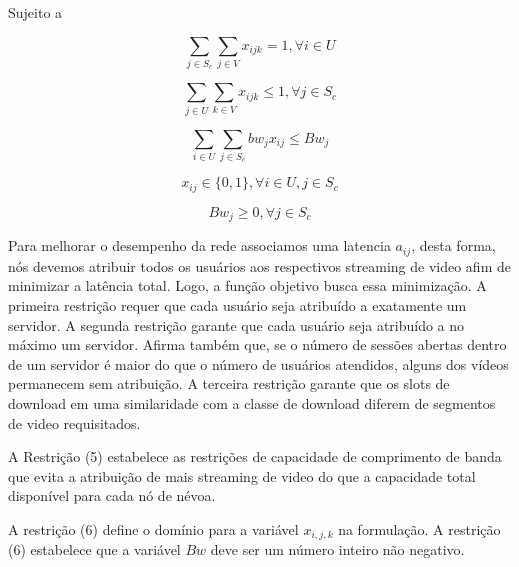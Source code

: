 Sujeito a

\begin{equation}\label{bound_1}
\sum_{ j \in S_{c} }
\sum_{ j \in V}
x_{ijk} = 1,  \forall i \in U
\end{equation}

\begin{equation}\label{bound_1}
\sum_{ j \in U}
\sum_{ k \in V }
x_{ijk} \leq 1,  \forall j \in S_{c}
\end{equation}

\begin{equation}\label{minimize}
\sum_{i \in U}
\sum_{j \in S_{c}}
bw_{j} x_{ij}
\leq Bw_{j}
\end{equation}

\begin{equation}\label{minimize}
x_{ij}  \in  \{0, 1\}, \forall i \in U,j \in S_{c}
\end{equation}

\begin{equation}\label{minimize}
Bw_{j} \geq  0, \forall j \in S_{c}
\end{equation}
\vspace{1.2cm}

Para melhorar o desempenho da rede associamos uma latencia $a_{ij}$, desta forma, nós devemos atribuir todos os usuários aos respectivos streaming de video afim de minimizar a latência total.
Logo, a função objetivo busca essa minimização. A primeira restrição requer que cada usuário seja atribuído a exatamente um servidor. A segunda restrição garante que cada usuário seja atribuído a no máximo um servidor. Afirma também que, se o número de sessões abertas dentro de um servidor é maior do que o número de usuários atendidos, alguns dos vídeos permanecem sem atribuição. A terceira restrição garante que os slots de download em uma similaridade com a classe de download diferem de segmentos de video requisitados.

A Restrição (5) estabelece as restrições de capacidade de comprimento de banda que evita a atribuição de mais streaming de video do que a capacidade total disponível para cada nó de névoa.

A restrição (6) define o domínio para a variável $x_{i, j, k}$ na formulação. A restrição (6) estabelece que a variável $Bw$ deve ser um número inteiro não negativo.

